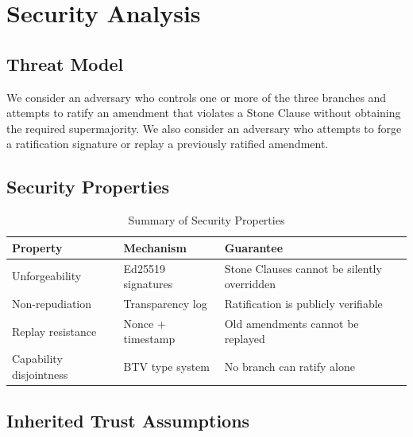 
\section{Security Analysis}
\label{sec:security}

\subsection{Threat Model}

We consider an adversary who controls one or more of the three branches
and attempts to ratify an amendment that violates a Stone Clause
without obtaining the required supermajority. We also consider an
adversary who attempts to forge a ratification signature or replay a
previously ratified amendment.

\subsection{Security Properties}

\begin{table}[h]
\centering
\caption{Summary of Security Properties}
\label{tab:security}
\begin{tabular}{lll}
\hline
Property & Mechanism & Guarantee \\
\hline
Unforgeability & Ed25519 signatures & Stone Clauses cannot be silently overridden \\
Non-repudiation & Transparency log & Ratification is publicly verifiable \\
Replay resistance & Nonce + timestamp & Old amendments cannot be replayed \\
Capability disjointness & BTV type system & No branch can ratify alone \\
\hline
\end{tabular}
\end{table}

\subsection{Inherited Trust Assumptions}
\label{subsec:inherited-trust}

